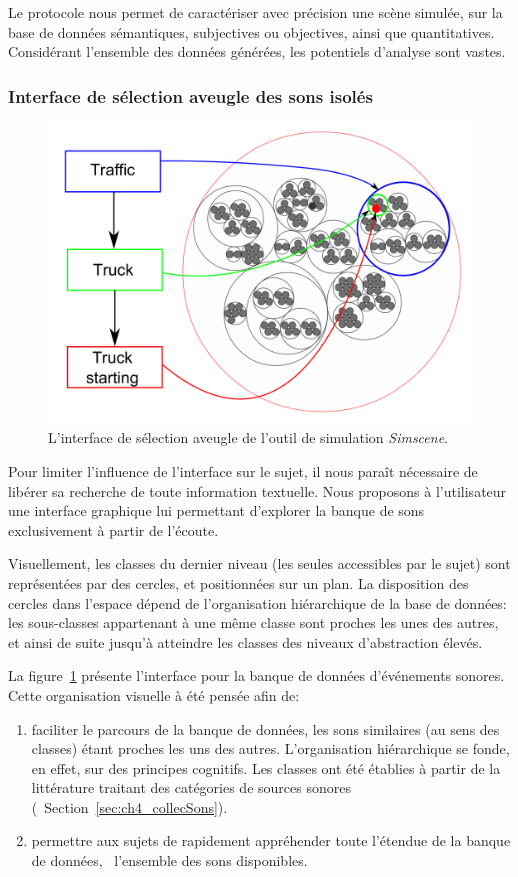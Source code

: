 Le protocole nous permet de caractériser avec précision une scène simulée, sur la base de données sémantiques, subjectives ou objectives, ainsi que quantitatives. Considérant l'ensemble des données générées, les potentiels d'analyse sont vastes.

\subsubsection{Interface de sélection aveugle des sons isolés}
\label{sec:ch4_ssf}

\begin{figure}[t]
        \myfloatalign
        \includegraphics[width=.8\linewidth]{gfx/ch_4/SSF}
       \caption{L'interface de sélection aveugle de l'outil de simulation \emph{Simscene}.}\label{fig:ssf}
\end{figure}

Pour limiter l’influence de l’interface sur le sujet, il nous paraît nécessaire de libérer sa recherche de toute information textuelle. Nous proposons à l'utilisateur une interface graphique lui permettant d’explorer la banque de sons exclusivement à partir de l’écoute.

Visuellement, les classes du dernier niveau (les seules accessibles par le sujet) sont représentées par des cercles, et positionnées sur un plan. La disposition des cercles dans l'espace dépend de l’organisation hiérarchique de la base de données: les sous-classes appartenant à une même classe sont proches les unes des autres, et ainsi de suite jusqu'à atteindre les classes des niveaux d'abstraction élevés.

La figure~\ref{fig:ssf} présente l'interface pour la banque de données d'événements sonores. Cette organisation visuelle à été pensée afin de:

\begin{enumerate}
\item faciliter le parcours de la banque de données, les sons similaires (au sens des classes) étant proches les uns des autres. L'organisation hiérarchique se fonde, en effet, sur des principes cognitifs. Les classes ont été établies à partir de la littérature traitant des catégories de sources sonores (\cf~Section~\ref{sec:ch4_collecSons}).
\item permettre aux sujets de rapidement appréhender toute l'étendue de la banque de données, \ie~l'ensemble des sons disponibles.
\end{enumerate}

